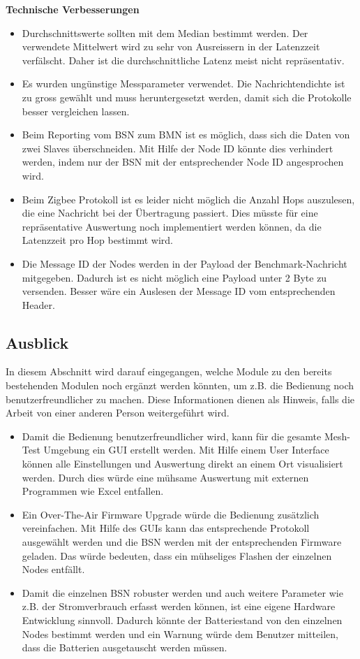 \textbf{Technische Verbesserungen}
\begin{itemize}
	\item Durchschnittswerte sollten mit dem Median bestimmt werden. Der verwendete Mittelwert wird zu sehr von Ausreissern in der Latenzzeit verfälscht. Daher ist die durchschnittliche Latenz meist nicht repräsentativ.
	\item Es wurden ungünstige Messparameter verwendet. Die Nachrichtendichte ist zu gross gewählt und muss heruntergesetzt werden, damit sich die Protokolle besser vergleichen lassen.
	\item Beim Reporting vom BSN zum BMN ist es möglich, dass sich die Daten von zwei Slaves überschneiden. Mit Hilfe der Node ID könnte dies verhindert werden, indem nur der BSN mit der entsprechender Node ID angesprochen wird.
	\item Beim Zigbee Protokoll ist es leider nicht möglich die Anzahl Hops auszulesen, die eine Nachricht bei der Übertragung passiert. Dies müsste für eine repräsentative Auswertung noch implementiert werden können, da die Latenzzeit pro Hop bestimmt wird.
	\item Die Message ID der Nodes werden in der Payload der Benchmark-Nachricht mitgegeben. Dadurch ist es nicht möglich eine Payload unter 2 Byte zu versenden. Besser wäre ein Auslesen der Message ID vom entsprechenden Header.
\end{itemize}

\newpage
\subsection{Ausblick}\label{subsec:Ausblick}
In diesem Abschnitt wird darauf eingegangen, welche Module zu den bereits bestehenden Modulen noch ergänzt werden könnten, um z.B. die Bedienung noch benutzerfreundlicher zu machen. Diese Informationen dienen als Hinweis, falls die Arbeit von einer anderen Person weitergeführt wird.

\begin{itemize}
	\item Damit die Bedienung benutzerfreundlicher wird, kann für die gesamte Mesh-Test Umgebung ein GUI erstellt werden. Mit Hilfe einem User Interface können alle Einstellungen und Auswertung direkt an einem Ort visualisiert werden. Durch dies würde eine mühsame Auswertung mit externen Programmen wie Excel entfallen.
	\item Ein Over-The-Air Firmware Upgrade würde die Bedienung zusätzlich vereinfachen. Mit Hilfe des GUIs kann das entsprechende Protokoll ausgewählt werden und die BSN werden mit der entsprechenden Firmware geladen. Das würde bedeuten, dass ein mühseliges Flashen der einzelnen Nodes entfällt.
	\item Damit die einzelnen BSN robuster werden und auch weitere Parameter wie z.B. der Stromverbrauch erfasst werden können, ist eine eigene Hardware Entwicklung sinnvoll. Dadurch könnte der Batteriestand von den einzelnen Nodes bestimmt werden und ein Warnung würde dem Benutzer mitteilen, dass die Batterien ausgetauscht werden müssen.
\end{itemize}

